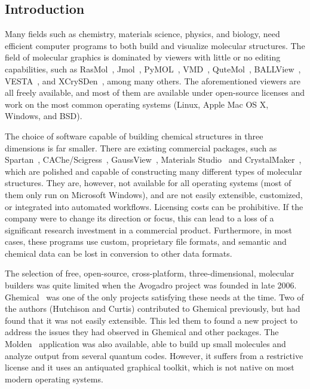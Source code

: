 \documentclass[10pt]{bmc_article}
\newenvironment{bmcformat}{\begin{raggedright}
\baselineskip20pt\sloppy\setboolean{publ}{false}}{\end{raggedright}
\baselineskip20pt\sloppy}
\begin{document}
\begin{bmcformat}
\begin{abstract}
\end{abstract}


\section{Introduction}

Many fields such as chemistry, materials science, physics, and biology, need
efficient computer programs to both build and visualize molecular structures.
The field of molecular graphics is dominated by viewers with little or no
editing capabilities, such as RasMol~\cite{RasMol}, Jmol~\cite{JMol},
PyMOL~\cite{PyMOL}, VMD~\cite{VMD}, QuteMol~\cite{QuteMol},
BALLView~\cite{BALLView}, VESTA~\cite{vesta3}, and
XCrySDen~\cite{xcrysden1}\cite{xcrysden2}, among many others. The aforementioned
viewers are all freely available, and most of them are available under
open-source licenses and work on the most common operating systems (Linux, Apple
Mac OS X, Windows, and BSD).

The choice of software capable of building chemical structures in
three dimensions is far smaller.
There are existing commercial packages, such as
Spartan~\cite{Spartan}, CAChe/Scigress~\cite{CAChe},
GaussView~\cite{GaussView}, Materials Studio~\cite{Accelrys} and
CrystalMaker~\cite{CrystalMaker}, which are polished and capable of
constructing many different types of molecular structures. They are,
however, not available for all operating systems (most of them only
run on Microsoft Windows), and are not easily extensible, customized,
or integrated into automated workflows. Licensing costs can be
prohibitive. If the company were to change its direction or focus, this
can lead to a loss of a significant research investment in a commercial
product. Furthermore, in most cases, these programs use custom,
proprietary file formats, and semantic and chemical data can be lost in
conversion to other data formats.

The selection of free, open-source, cross-platform, three-dimensional,
molecular builders was quite limited when the Avogadro project was founded in late 2006.
Ghemical~\cite{Ghemical} was one of the only projects satisfying these needs at
the time. Two of the authors (Hutchison and Curtis) contributed to Ghemical
previously, but had found that it was not easily extensible. This led them to
found a new project to address the issues they had observed in Ghemical
and other packages. The Molden~\cite{Molden} application was also available,
able to build up small molecules and analyze output from several quantum codes.
However, it suffers from a restrictive license and it uses an antiquated graphical
toolkit, which is not native on most modern operating systems.


\end{bmcformat}
\end{document}
